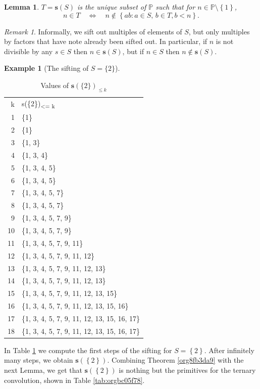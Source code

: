 \documentclass[12pt]{article}
\theoremstyle{definition}
\newtheorem{mexample}{Example}
\theoremstyle{remark}
\newtheorem{remark}{Remark}
\theoremstyle{plain}
\newtheorem{lemma}{Lemma}
\newcommand{\set}[1]{\left\{{#1}\right\}}
\newcommand\setsuchas[2]{\left\{{#1}:{#2}\right\}}
\newcommand{\NNp}{{\mathbb{P}}}
\newcommand{\ssift}[1]{\mathbf{s}({#1})}
\begin{document}
\begin{lemma}
\(T=\ssift{S}\) is the unique subset of \(\NNp\) such that
for \(n \in \NNp \setminus \set{1}\),
\[
  n \in T \quad \iff \quad n \not \in \setsuchas{ab}{a \in S, \, b \in T,  b < n}.
\]
\end{lemma}

\begin{remark}
Informally, we sift out multiples of elements of \(S\), but only multiples by factors that have note already been sifted out.
In particular, if \(n\) is not divisible by any \(s \in S\) then \(n \in \ssift{S}\), but if \(n \in S\) then \(n \not\in \ssift{S}\).
\end{remark}

\begin{mexample}[The sifting of $S=\{2\}$]
\begin{table}[tbhp]
\caption{\label{tab:orgd454ebf}Values of \(\mathbf{s}(\{2\})_{\le k}\)}
\centering
\begin{tabular}{rl}
k & s(\{2\})\textsubscript{<= k}\\
1 & \{1\}\\
2 & \{1\}\\
3 & \{1, 3\}\\
4 & \{1, 3, 4\}\\
5 & \{1, 3, 4, 5\}\\
6 & \{1, 3, 4, 5\}\\
7 & \{1, 3, 4, 5, 7\}\\
8 & \{1, 3, 4, 5, 7\}\\
9 & \{1, 3, 4, 5, 7, 9\}\\
10 & \{1, 3, 4, 5, 7, 9\}\\
11 & \{1, 3, 4, 5, 7, 9, 11\}\\
12 & \{1, 3, 4, 5, 7, 9, 11, 12\}\\
13 & \{1, 3, 4, 5, 7, 9, 11, 12, 13\}\\
14 & \{1, 3, 4, 5, 7, 9, 11, 12, 13\}\\
15 & \{1, 3, 4, 5, 7, 9, 11, 12, 13, 15\}\\
16 & \{1, 3, 4, 5, 7, 9, 11, 12, 13, 15, 16\}\\
17 & \{1, 3, 4, 5, 7, 9, 11, 12, 13, 15, 16, 17\}\\
18 & \{1, 3, 4, 5, 7, 9, 11, 12, 13, 15, 16, 17\}\\
\end{tabular}
\end{table}

In Table \ref{tab:orgd454ebf} we compute the first steps of the sifting for \(S=\set{2}\).
After infinitely many steps, we obtain \(\ssift{\set{2}}\). Combining
Theorem \ref{org8fb3da9} with the next Lemma, we get that \(\ssift{\set{2}}\)
is nothing but the primitives for the ternary convolution,
shown in Table \ref{tab:orgbc05f78}.
\label{orge7d6215}
\end{mexample}
\end{document}
